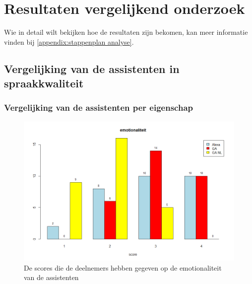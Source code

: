 
\chapter{Resultaten vergelijkend onderzoek}
\label{ch:resultaten}
Wie in detail wilt bekijken hoe de resultaten zijn bekomen, kan meer informatie vinden bij \ref{appendix:stappenplan analyse}.

\section{Vergelijking van de assistenten in spraakkwaliteit}
\label{s:Vergelijking van de assistenten in spraakkwaliteit}

\subsection{Vergelijking van de assistenten per eigenschap}
\label{ss:Vergelijking van de assistenten per eigenschap}

\begin{figure}[H]
    \centering
    \includegraphics[width=0.9\linewidth]{../onderzoek/onderzoeksresultaten/vergelijking_assistenten_per_eigenschap/barplot/barplot_score_emotionaliteit}
    \caption{De scores die de deelnemers hebben gegeven op de emotionaliteit van de assistenten}
    \label{fig:barplot-emotionaliteit}
\end{figure}

